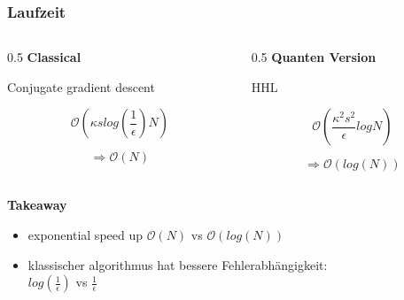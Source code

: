 \begin{frame}
    \frametitle{Laufzeit}
    \begin{columns}[c]
        \begin{column}{0.5\hsize}
            \textbf{Classical}

            \hfil

            Conjugate gradient descent 

            $$ \mathcal{O}(\kappa s log{\left(\frac 1 \epsilon\right)} N ) $$

            $$ \Rightarrow \mathcal{O} (N) $$

        \end{column}
        

        \begin{column}{0.5\hsize}
            \textbf{Quanten Version}

            \hfil

            HHL

            $$ \mathcal{O}(\frac{\kappa^2s^2}{\epsilon}logN) $$

            $$ \Rightarrow \mathcal{O} (log(N)) $$
        \end{column}

    \end{columns}
 
    \hfil

    \hfil

    \textbf{Takeaway}
    \begin{itemize}
        \item exponential speed up $\mathcal{O} (N)$ vs $\mathcal{O} (log(N))$
        \item klassischer algorithmus hat bessere Fehlerabhängigkeit: \\$log(\frac1{\epsilon})$ vs $\frac{1}{\epsilon}$
    \end{itemize}


\end{frame}



